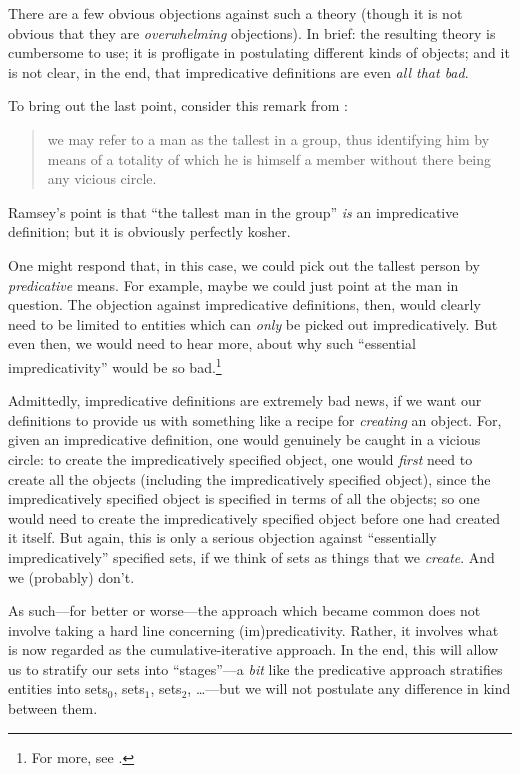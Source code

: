 \documentclass[../../../include/open-logic-section]{subfiles}
\begin{document}
There are a few obvious objections against such a theory (though it is
not obvious that they are \emph{overwhelming} objections). In brief:
the resulting theory is cumbersome to use; it is profligate in
postulating different kinds of objects; and it is not clear, in the
end, that impredicative definitions are even  \emph{all that bad}. 
	
To bring out the last point, consider this remark from
\citeauthor{Ramsey1925}:
\begin{quote}
	we may refer to a man as the tallest in a group, thus identifying
	him by means of a totality of which he is himself a member without
	there being any vicious circle. \citep{Ramsey1925}
\end{quote}
Ramsey's point is that ``the tallest man in the group'' \emph{is} an
impredicative definition; but it is obviously perfectly kosher. 

One might respond that, in this case, we could pick out the tallest
person by \emph{predicative} means. For example, maybe we could just
point at the man in question. The objection against impredicative
definitions, then, would clearly need to be limited to entities which
can \emph{only} be picked out impredicatively. But even then, we would
need to hear more, about why such ``essential impredicativity'' would
be so bad.\footnote{For more, see \citet{Linnebo2010}.}

Admittedly, impredicative definitions are extremely bad news, if we
want our definitions to provide us with something like a recipe for
\emph{creating} an object. For, given an impredicative definition, one
would genuinely be caught in a vicious circle: to create the
impredicatively specified object, one would \emph{first} need to
create all the objects (including the impredicatively specified
object), since the impredicatively specified object is specified in
terms of all the objects; so one would need to create the
impredicatively specified object before one had created it itself. But
again, this is only a serious objection against ``essentially
impredicatively'' specified sets, if we think of sets as things that
we \emph{create}. And we (probably) don't.

As such---for better or worse---the approach which became common does
not involve taking a hard line concerning (im)\-pre\-di\-ca\-tiv\-ity.
Rather, it involves what is now regarded as the cumulative-iterative
approach. In the end, this will allow us to stratify our sets into
``stages''---a \emph{bit} like the predicative approach stratifies
entities into sets$_0$, sets$_1$, sets$_2$, \ldots---but we will not
postulate any difference in kind between them. 
\end{document}
